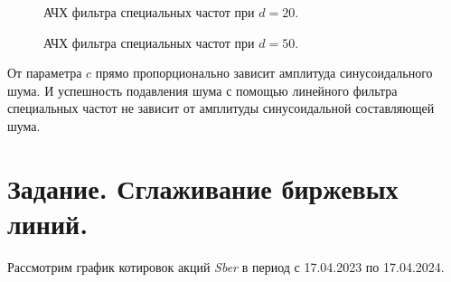 \documentclass[a5paper, 10pt]{article}
\theoremstyle{definition}
\theoremstyle{plain}
\theoremstyle{remark}
\begin{document}
\begin{figure}[h!]
\caption{АЧХ фильтра специальных частот при $d=20$.}
\caption{АЧХ фильтра специальных частот при $d=50$.}
\end{figure}

\newpage
От параметра $c$ прямо пропорционально зависит амплитуда синусоидального шума. И успешность подавления шума с помощью линейного фильтра специальных частот не зависит от амплитуды синусоидальной составляющей шума.



\section{Задание. Сглаживание биржевых линий.}
Рассмотрим график котировок акций \textit{Sber} в период с 17.04.2023 по 17.04.2024.
\end{document}
